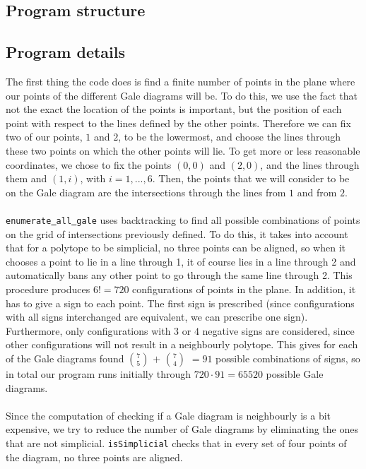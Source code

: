 \documentclass[paper=a4, fontsize=11pt]{scrartcl} %
\theoremstyle{definition}
\begin{document}
\subsection{Program structure}

\subsection{Program details}
The first thing the code does is find a finite number of points in the plane where our points of the different Gale diagrams will be. To do this, we use the fact that not the exact the location of the points is important, but the position of each point with respect to the lines defined by the other points. Therefore we can fix two of our points, $1$ and $2$, to be the lowermost, and choose the lines through these two points on which the other points will lie. To get more or less reasonable coordinates, we chose to fix the points $(0,0)$ and $(2,0)$, and the lines through them and $(1,i)$, with $i =1,...,6$. Then, the points that we will consider to be on the Gale diagram are the intersections through the lines from $1$ and from $2$.\\
\\
\texttt{enumerate\underline{ }all\underline{ }gale} uses backtracking to find all possible combinations of  points on the grid of intersections previously defined. To do this, it takes into account that for a polytope to be simplicial, no three points can be aligned, so when it chooses a point to lie in a line through 1, it of course lies in a line through 2 and automatically bans any other point to go through the same line through 2. This procedure produces $6! = 720$ configurations of points in the plane. In addition, it has to give a sign to each point. The first sign is prescribed (since configurations with all signs interchanged are equivalent, we can prescribe one sign). Furthermore, only configurations with $3$ or $4$ negative signs are considered, since other configurations will not result in a neighbourly polytope. This gives for each of the Gale diagrams found $7\choose 5$ $+$ $7\choose 4$ $= 91$ possible combinations of signs, so in total our program runs initially through $720\cdot 91 = 65520$ possible Gale diagrams.\\
\\
Since the computation of checking if a Gale diagram is neighbourly is a bit expensive, we try to reduce the number of Gale diagrams by eliminating the ones that are not simplicial. \texttt{isSimplicial} checks that in every set of four points of the diagram, no three points are aligned.\\
\end{document}
